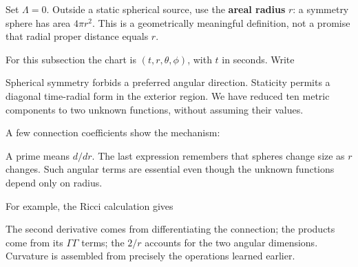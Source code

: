 \documentclass[
  11pt,
  letterpaper,
  oneside,
  openany]{scrbook}
\begin{document}
Set \(\Lambda=0\). Outside a static spherical source, use the
\textbf{areal radius} \(r\): a symmetry sphere has area \(4\pi r^2\).
This is a geometrically meaningful definition, not a promise that radial
proper distance equals \(r\).

For this subsection the chart is \((t,r,\theta,\phi)\), with \(t\) in
seconds. Write

\begin{center}
\begingroup
{}
\ifdim\wd\grmathbox>\linewidth
\resizebox{\linewidth}{!}{\usebox{\grmathbox}}
\else\usebox{\grmathbox}\fi
\endgroup
\end{center}

Spherical symmetry forbids a preferred angular direction. Staticity
permits a diagonal time-radial form in the exterior region. We have
reduced ten metric components to two unknown functions, without assuming
their values.

A few connection coefficients show the mechanism:

\begin{center}
\begingroup
{}
\ifdim\wd\grmathbox>\linewidth
\resizebox{\linewidth}{!}{\usebox{\grmathbox}}
\else\usebox{\grmathbox}\fi
\endgroup
\end{center}

A prime means \(d/dr\). The last expression remembers that spheres
change size as \(r\) changes. Such angular terms are essential even
though the unknown functions depend only on radius.

For example, the Ricci calculation gives

\begin{center}
\begingroup
{}
\ifdim\wd\grmathbox>\linewidth
\resizebox{\linewidth}{!}{\usebox{\grmathbox}}
\else\usebox{\grmathbox}\fi
\endgroup
\end{center}

The second derivative comes from differentiating the connection; the
products come from its \(\Gamma\Gamma\) terms; the \(2/r\) accounts for
the two angular dimensions. Curvature is assembled from precisely the
operations learned earlier.
\end{document}
